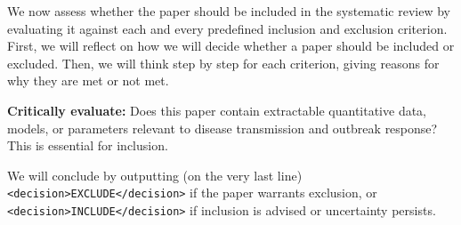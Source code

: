 \begin{tcolorbox}
\begin{tcolorbox}[
    enhanced,
    colback=gray!5,
    colframe=gray!20,
    boxrule=0pt,
    leftrule=3pt,
    arc=0pt,
    left=6pt, right=6pt, top=4pt, bottom=4pt
]
\vspace{4pt}
{\small
We now assess whether the paper should be included in the systematic review by evaluating it against each and every predefined inclusion and exclusion criterion. First, we will reflect on how we will decide whether a paper should be included or excluded. Then, we will think step by step for each criterion, giving reasons for why they are met or not met.

\vspace{4pt}
\textbf{Critically evaluate:} Does this paper contain extractable quantitative data, models, or parameters relevant to disease transmission and outbreak response? This is essential for inclusion.

\vspace{4pt}
We will conclude by outputting (on the very last line) \texttt{<decision>EXCLUDE</decision>} if the paper warrants exclusion, or \texttt{<decision>INCLUDE</decision>} if inclusion is advised or uncertainty persists.
}
\end{tcolorbox}

\end{tcolorbox}
